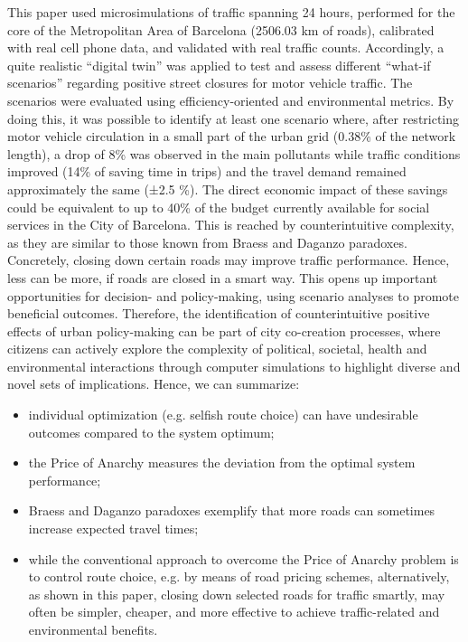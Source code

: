 This paper used microsimulations of traffic spanning 24 hours, performed for the core of the Metropolitan Area of Barcelona (2506.03 km of roads), calibrated with real cell phone data, and validated with real traffic counts. Accordingly, a quite realistic “digital twin”  was applied to test and assess different “what-if scenarios” regarding positive street closures for motor vehicle traffic. The scenarios were evaluated using efficiency-oriented and environmental metrics. By doing this, it was possible to identify at least one scenario where, after restricting motor vehicle circulation in a small part of the urban grid (0.38\% of the network length), a drop of 8\% was observed in the main pollutants while traffic conditions improved (14\% of saving time in trips) and the travel demand remained approximately the same (±2.5 \%). The direct economic impact of these savings could be equivalent to up to 40\% of the budget currently available for social services in the City of Barcelona. This is reached by counterintuitive complexity, as they are similar to those known from Braess and Daganzo paradoxes. Concretely, closing down certain roads may improve traffic performance. Hence, less can be more, if roads are closed in a smart way. This opens up important opportunities for  decision- and policy-making, using scenario analyses to promote beneficial outcomes. Therefore, the identification of counterintuitive positive effects of urban policy-making can be part of city co-creation processes, where citizens can actively explore the complexity of political, societal, health and environmental interactions through computer simulations to highlight diverse and novel sets of implications. Hence, we can summarize:
\begin{itemize}
    \item individual optimization (e.g. selfish route choice) can have undesirable outcomes compared to the system optimum;
    \item the Price of Anarchy measures the deviation from the optimal system performance;
    \item Braess and Daganzo paradoxes exemplify that more roads can sometimes increase expected travel times;
    \item while the conventional approach to overcome the Price of Anarchy problem is to control route choice, e.g. by means of road pricing schemes, alternatively, as shown in this paper, closing down selected roads for traffic smartly, may often be simpler, cheaper, and more effective to achieve traffic-related and environmental benefits.
\end{itemize}
